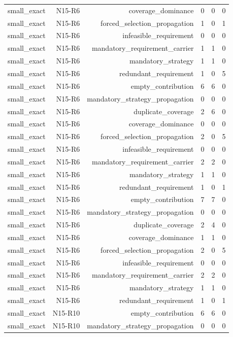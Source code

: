 {\begin{longtable}{lrrrrr}
small\_exact & N15-R6 & coverage\_dominance & 0 & 0 & 0 \\
small\_exact & N15-R6 & forced\_selection\_propagation & 1 & 0 & 1 \\
small\_exact & N15-R6 & infeasible\_requirement & 0 & 0 & 0 \\
small\_exact & N15-R6 & mandatory\_requirement\_carrier & 1 & 1 & 0 \\
small\_exact & N15-R6 & mandatory\_strategy & 1 & 1 & 0 \\
small\_exact & N15-R6 & redundant\_requirement & 1 & 0 & 5 \\
small\_exact & N15-R6 & empty\_contribution & 6 & 6 & 0 \\
small\_exact & N15-R6 & mandatory\_strategy\_propagation & 0 & 0 & 0 \\
small\_exact & N15-R6 & duplicate\_coverage & 2 & 6 & 0 \\
small\_exact & N15-R6 & coverage\_dominance & 0 & 0 & 0 \\
small\_exact & N15-R6 & forced\_selection\_propagation & 2 & 0 & 5 \\
small\_exact & N15-R6 & infeasible\_requirement & 0 & 0 & 0 \\
small\_exact & N15-R6 & mandatory\_requirement\_carrier & 2 & 2 & 0 \\
small\_exact & N15-R6 & mandatory\_strategy & 1 & 1 & 0 \\
small\_exact & N15-R6 & redundant\_requirement & 1 & 0 & 1 \\
small\_exact & N15-R6 & empty\_contribution & 7 & 7 & 0 \\
small\_exact & N15-R6 & mandatory\_strategy\_propagation & 0 & 0 & 0 \\
small\_exact & N15-R6 & duplicate\_coverage & 2 & 4 & 0 \\
small\_exact & N15-R6 & coverage\_dominance & 1 & 1 & 0 \\
small\_exact & N15-R6 & forced\_selection\_propagation & 2 & 0 & 5 \\
small\_exact & N15-R6 & infeasible\_requirement & 0 & 0 & 0 \\
small\_exact & N15-R6 & mandatory\_requirement\_carrier & 2 & 2 & 0 \\
small\_exact & N15-R6 & mandatory\_strategy & 1 & 1 & 0 \\
small\_exact & N15-R6 & redundant\_requirement & 1 & 0 & 1 \\
small\_exact & N15-R10 & empty\_contribution & 6 & 6 & 0 \\
small\_exact & N15-R10 & mandatory\_strategy\_propagation & 0 & 0 & 0 \\

\end{longtable}}
